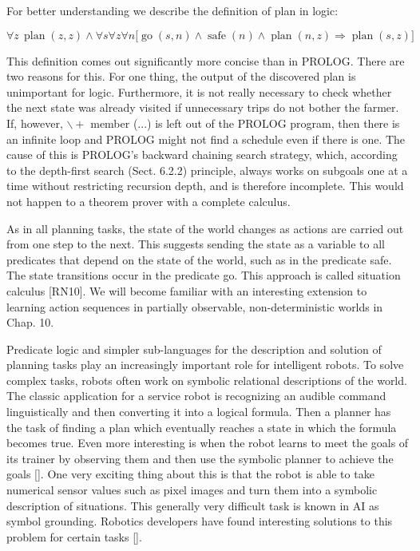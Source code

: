 \documentclass[10pt]{book}
\begin{document}
For better understanding we describe the definition of plan in logic:

$$
\forall z\, \operatorname{plan}(z, z) \wedge \forall s \forall z \forall n \bigl[\operatorname{go}(s, n) \wedge \operatorname{safe}(n) \wedge \operatorname{plan}(n, z) \Rightarrow \operatorname{plan}(s, z)\bigr]
$$

This definition comes out significantly more concise than in PROLOG. There are two reasons for this. For one thing, the output of the discovered plan is unimportant for logic. Furthermore, it is not really necessary to check whether the next state was already visited if unnecessary trips do not bother the farmer. If, however, $\backslash+$ member (...) is left out of the PROLOG program, then there is an infinite loop and PROLOG might not find a schedule even if there is one. The cause of this is PROLOG's backward chaining search strategy, which, according to the depth-first search (Sect. 6.2.2) principle, always works on subgoals one at a time without restricting recursion depth, and is therefore incomplete. This would not happen to a theorem prover with a complete calculus.

As in all planning tasks, the state of the world changes as actions are carried out from one step to the next. This suggests sending the state as a variable to all predicates that depend on the state of the world, such as in the predicate safe. The state transitions occur in the predicate go. This approach is called situation calculus [RN10]. We will become familiar with an interesting extension to learning action sequences in partially observable, non-deterministic worlds in Chap. 10.

Predicate logic and simpler sub-languages for the description and solution of planning tasks play an increasingly important role for intelligent robots. To solve complex tasks, robots often work on symbolic relational descriptions of the world. The classic application for a service robot is recognizing an audible command linguistically and then converting it into a logical formula. Then a planner has the task of finding a plan which eventually reaches a state in which the formula becomes true. Even more interesting is when the robot learns to meet the goals of its trainer by observing them and then use the symbolic planner to achieve the goals [\cite{cubek2015hllfd}]. One very exciting thing about this is that the robot is able to take numerical sensor values such as pixel images and turn them into a symbolic description of situations. This generally very difficult task is known in AI as symbol grounding. Robotics developers have found interesting solutions to this problem for certain tasks [\cite{cubek2015symbolgrounding}].
\end{document}
